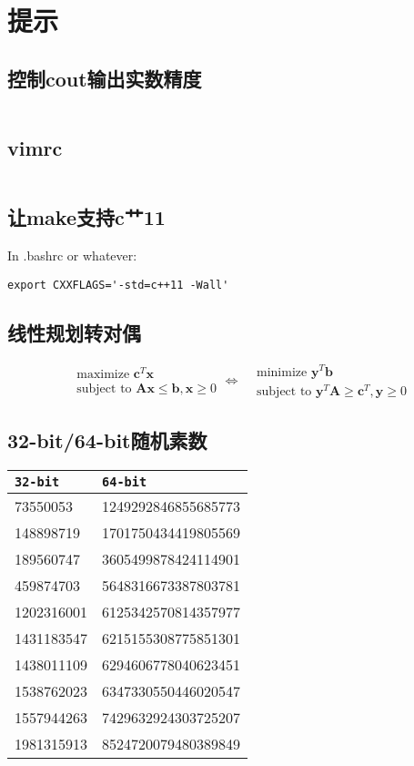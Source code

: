 \chapter{提示}

\section{控制cout输出实数精度}
\inputminted{cpp}{\source/hints/control-cout-precision.cpp}
\section{vimrc}
\inputminted{text}{\source/hints/vimrc}
\section{让make支持c艹11}
In .bashrc or whatever:
\begin{verbatim}
export CXXFLAGS='-std=c++11 -Wall'
\end{verbatim}

\section{线性规划转对偶}

\begin{equation*}
\begin{aligned}
&\text{maximize }\mathbf{c}^{T}\mathbf{x}\\
&\text{subject to }\mathbf{A}\mathbf{x} \leq \mathbf{b}, \mathbf{x} \geq 0
\end{aligned}
\Longleftrightarrow
\begin{aligned}
&\text{minimize }\mathbf{y}^{T}\mathbf{b}\\
&\text{subject to }\mathbf{y}^{T}\mathbf{A} \geq \mathbf{c}^{T}, \mathbf{y} \geq 0
\end{aligned}
\end{equation*}

\section{32-bit/64-bit随机素数}
\begin{tabular}{|l|l|}
\hline
\texttt{32-bit} & \texttt{64-bit} \\
\hline
73550053 & 1249292846855685773 \\
\hline
148898719 & 1701750434419805569 \\
\hline
189560747 & 3605499878424114901 \\
\hline
459874703 & 5648316673387803781 \\
\hline
1202316001 & 6125342570814357977 \\
\hline
1431183547 & 6215155308775851301 \\
\hline
1438011109 & 6294606778040623451 \\
\hline
1538762023 & 6347330550446020547 \\
\hline
1557944263 & 7429632924303725207 \\
\hline
1981315913 & 8524720079480389849 \\
\hline
\end{tabular}

